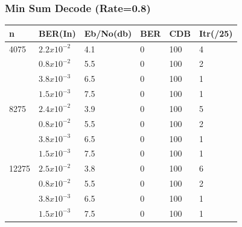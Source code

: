 \documentclass[xcolor=dvipsname]
{beamer}
\begin{document}
\begin{frame}[t] 
\frametitle{Min Sum Decode (Rate=0.8)}
\begin{table}[]
\label{my-label}
\begin{tabular}{|l|l|l|l|l|l|}
\hline
n     & BER(In)  	& Eb/No(db) & BER & CDB & Itr(/25) \\ \hline
4075  &	$2.2x10^{-2}$ & 4.1   & 0   & 100 & 4         \\  \hline
	  &	$0.8x10^{-2}$ & 5.5   & 0   & 100 & 2         \\
      &	$3.8x10^{-3}$ & 6.5   & 0   & 100 & 1         \\ 
      &	$1.5x10^{-3}$ & 7.5   & 0   & 100 & 1         \\ \hline
8275  &	$2.4x10^{-2}$ & 3.9   & 0   & 100 & 5         \\  \hline
	  &	$0.8x10^{-2}$ & 5.5   & 0   & 100 & 2         \\ 
      &	$3.8x10^{-3}$ & 6.5   & 0   & 100 & 1         \\ 
      &	$1.5x10^{-3}$ & 7.5   & 0   & 100 & 1         \\ \hline
12275 &	$2.5x10^{-2}$ & 3.8   & 0   & 100 & 6         \\ \hline
      &	$0.8x10^{-2}$ & 5.5   & 0   & 100 & 2         \\  
      &	$3.8x10^{-3}$ & 6.5   & 0   & 100 & 1         \\
      &	$1.5x10^{-3}$ & 7.5   & 0   & 100 & 1         \\ \hline
\end{tabular}
\end{table}
\end{frame}
\end{document}
